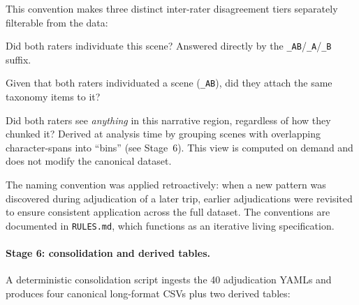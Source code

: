 This convention makes three distinct inter-rater disagreement tiers separately filterable from the data:

\begin{description}[itemsep=2pt]
\item[Tier 1 (scene individuation):] Did both raters individuate this scene? Answered directly by the \texttt{\_AB}/\texttt{\_A}/\texttt{\_B} suffix.
\item[Tier 2 (attribute classification):] Given that both raters individuated a scene (\texttt{\_AB}), did they attach the same taxonomy items to it?
\item[Tier 0 (binned view, analytical only):] Did both raters see \emph{anything} in this narrative region, regardless of how they chunked it? Derived at analysis time by grouping scenes with overlapping character-spans into ``bins'' (see Stage~6). This view is computed on demand and does not modify the canonical dataset.
\end{description}

The naming convention was applied retroactively: when a new pattern was discovered during adjudication of a later trip, earlier adjudications were revisited to ensure consistent application across the full dataset. The conventions are documented in \texttt{RULES.md}, which functions as an iterative living specification.

\paragraph{Stage 6: consolidation and derived tables.} A deterministic consolidation script ingests the 40 adjudication YAMLs and produces four canonical long-format CSVs plus two derived tables:

